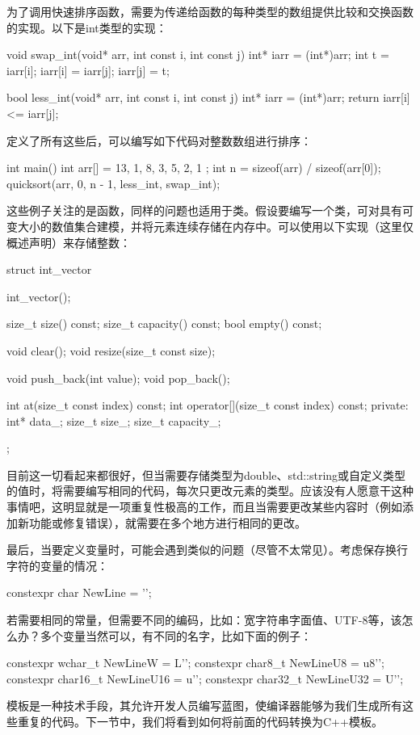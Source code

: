 为了调用快速排序函数，需要为传递给函数的每种类型的数组提供比较和交换函数的实现。以下是int类型的实现：

\begin{cpp}
void swap_int(void* arr, int const i, int const j)
{
	int* iarr = (int*)arr;
	int t = iarr[i];
	iarr[i] = iarr[j];
	iarr[j] = t;
}

bool less_int(void* arr, int const i, int const j)
{
	int* iarr = (int*)arr;
	return iarr[i] <= iarr[j];
}
\end{cpp}

定义了所有这些后，可以编写如下代码对整数数组进行排序：

\begin{cpp}
int main()
{
	int arr[] = { 13, 1, 8, 3, 5, 2, 1 };
	int n = sizeof(arr) / sizeof(arr[0]);
	quicksort(arr, 0, n - 1, less_int, swap_int);
}
\end{cpp}

这些例子关注的是函数，同样的问题也适用于类。假设要编写一个类，可对具有可变大小的数值集合建模，并将元素连续存储在内存中。可以使用以下实现（这里仅概述声明）来存储整数：

\begin{cpp}
struct int_vector
{
	int_vector();
	
	size_t size() const;
	size_t capacity() const;
	bool empty() const;
	
	void clear();
	void resize(size_t const size);
	
	void push_back(int value);
	void pop_back();
	
	int at(size_t const index) const;
	int operator[](size_t const index) const;
private:
	int* data_;
	size_t size_;
	size_t capacity_;
};
\end{cpp}

目前这一切看起来都很好，但当需要存储类型为double、std::string或自定义类型的值时，将需要编写相同的代码，每次只更改元素的类型。应该没有人愿意干这种事情吧，这明显就是一项重复性极高的工作，而且当需要更改某些内容时（例如添加新功能或修复错误），就需要在多个地方进行相同的更改。

最后，当要定义变量时，可能会遇到类似的问题（尽管不太常见）。考虑保存换行字符的变量的情况：

\begin{cpp}
constexpr char NewLine = '\n';
\end{cpp}

若需要相同的常量，但需要不同的编码，比如：宽字符串字面值、UTF-8等，该怎么办？多个变量当然可以，有不同的名字，比如下面的例子：

\begin{cpp}
constexpr wchar_t NewLineW = L'\n';
constexpr char8_t NewLineU8 = u8'\n';
constexpr char16_t NewLineU16 = u'\n';
constexpr char32_t NewLineU32 = U'\n';
\end{cpp}

模板是一种技术手段，其允许开发人员编写蓝图，使编译器能够为我们生成所有这些重复的代码。下一节中，我们将看到如何将前面的代码转换为C++模板。






